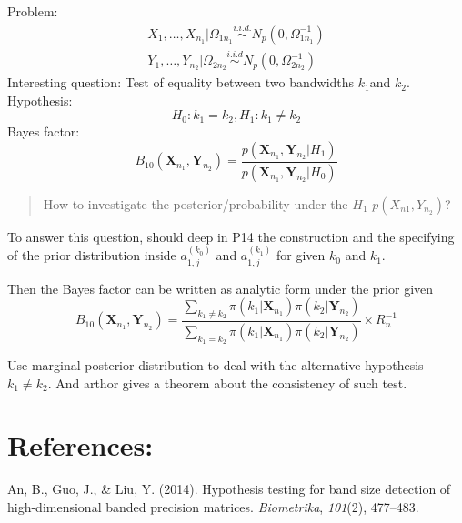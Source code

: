 \documentclass[]{article}
\begin{document}
Problem: \[
\begin{array} { c } { X _ { 1 } , \ldots , X _ { n _ { 1 } } | \Omega _ { 1 n _ { 1 } } \stackrel { i . i . d . } { \sim } N _ { p } \left( 0 , \Omega _ { 1 n _ { 1 } } ^ { - 1 } \right)} \\ { Y _ { 1 } , \ldots , Y _ { n _ { 2 } } | \Omega _ { 2 n _ { 2 } } \stackrel { i . i . d } { \sim } N _ { p } \left( 0 , \Omega _ { 2 n _ { 2 } } ^ { - 1 } \right) } \end{array}
\] Interesting question: Test of equality between two bandwidths
\(k_1\)and \(k_2\). Hypothesis: \[
H _ { 0 } : k _ { 1 } = k _ { 2 },H _ { 1 } : k _ { 1 } \neq k _ { 2 }
\] Bayes factor: \[
B _ { 10 } \left( \mathbf { X } _ { n _ { 1 } } , \mathbf { Y } _ { n _ { 2 } } \right) = \frac { p \left( \mathbf { X } _ { n _ { 1 } } , \mathbf { Y } _ { n _ { 2 } } | H _ { 1 } \right) } { p \left( \mathbf { X } _ { n _ { 1 } } , \mathbf { Y } _ { n _ { 2 } } | H _ { 0 } \right) }
\]

\begin{quote}
How to investigate the posterior/probability under the \(H_1\)
\(p(X_{n1},Y_{n_2})\)?
\end{quote}

To answer this question, should deep in P14 the construction and the
specifying of the prior distribution inside \(a_{1,j}^{(k_0)}\) and
\(a_{1,j}^{(k_1)}\) for given \(k_0\) and \(k_1\).

Then the Bayes factor can be written as analytic form under the prior
given \[
B _ { 10 } \left( \mathbf { X } _ { n _ { 1 } } , \mathbf { Y } _ { n _ { 2 } } \right) = \frac { \sum _ { k _ { 1 } \neq k _ { 2 } } \pi \left( k _ { 1 } | \mathbf { X } _ { n _ { 1 } } \right) \pi \left( k _ { 2 } | \mathbf { Y } _ { n _ { 2 } } \right) } { \sum _ { k _ { 1 } = k _ { 2 } } \pi \left( k _ { 1 } | \mathbf { X } _ { n _ { 1 } } \right) \pi \left( k _ { 2 } | \mathbf { Y } _ { n _ { 2 } } \right) } \times R _ { n } ^ { - 1 }
\]

Use marginal posterior distribution to deal with the alternative
hypothesis \(k_1\neq k_2\). And arthor gives a theorem about the
consistency of such test.

\hypertarget{references}{%
\section*{References:}\label{references}}

\hypertarget{refs}{}
\leavevmode\hypertarget{ref-An:2014jc}{}%
An, B., Guo, J., \& Liu, Y. (2014). Hypothesis testing for band size
detection of high-dimensional banded precision matrices.
\emph{Biometrika}, \emph{101}(2), 477--483.
\end{document}
